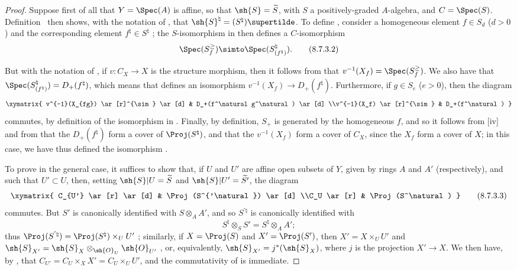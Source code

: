 \begin{proof}
Suppose first of all that $Y=\Spec(A)$ is affine, so that $\sh{S}=\widetilde{S}$, with $S$ a positively-graded $A$-algebra, and $C=\Spec(S)$.
Definition~ then shows, with the notation of , that $\sh{S}^\natural=(S^\natural)\supertilde$.
To define , consider a homogeneous element $f\in S_d$ ($d>0$) and the corresponding element $f^\natural\in S^\natural$ ;
the $S$-isomorphism in  then defines a $C$-isomorphism
\[
\label{II.8.7.3.2}
  \Spec(S_f^\geq) \simto \Spec(S_{(f^\natural)}^\natural).
\tag{8.7.3.2}
\]

But with the notation of , if $v:C_X\to X$ is the structure morphism, then it follows from  that $v^{-1}(X_f)=\Spec(S_f^\geq)$.
We also have that $\Spec(S_{(f^\natural)}^\natural)=D_+(f^\natural)$, which means that  defines an isomorphism $v^{-1}(X_f)\to D_+(f^\natural)$.
Furthermore, if $g\in S_e$ ($e>0$), then the diagram
\[
  \xymatrix{
    v^{-1}(X_{fg})
      \ar[r]^{\sim}
      \ar[d]
  & D_+(f^\natural g^\natural)
      \ar[d]
  \\v^{-1}(X_f)
      \ar[r]^{\sim}
  & D_+(f^\natural)
  }
\]
commutes, by definition of the isomorphism in .
Finally, by definition, $S_+$ is generated by the homogeneous $f$, and so it follows from [iv] and from  that the $D_+(f^\natural)$ form a cover of $\Proj(S^\natural)$, and that the $v^{-1}(X_f)$ form a cover of $C_X$, since the $X_f$ form a cover of $X$;
in this case, we have thus defined the isomorphism .

To prove  in the general case, it suffices to show that, if $U$ and $U'$ are affine open subsets of $Y$, given by rings $A$ and $A'$ (respectively), and such that $U'\subset U$, then, setting $\sh{S}|U=\widetilde{S}$ and $\sh{S}|U'=\widetilde{S'}$, the diagram
\[
\label{II.8.7.3.3}
  \xymatrix{
    C_{U'}
      \ar[r]
      \ar[d]
  & \Proj(S^{'\natural})
      \ar[d]
  \\C_U
      \ar[r]
  & \Proj(S^\natural)
  }
\tag{8.7.3.3}
\]
commutes.
But $S'$ is canonically identified with $S\otimes_A A'$, and so $S^{'\natural}$ is canonically identified with
\[
  S^\natural \otimes_S S' = S^\natural \otimes_A A';
\]
thus $\Proj(S^{'\natural}) = \Proj(S^\natural)\times_U U'$ ;
similarly, if $X=\Proj(S)$ and $X'=\Proj(S')$, then $X'=X\times_U U'$ and $\sh{S}_{X'}=\sh{S}_X\otimes_{\sh{O}_U}\sh{O}_{U'}$ , or, equivalently, $\sh{S}_{X'}=j^*(\sh{S}_X)$, where $j$ is the projection $X'\to X$.
We then have, by , that $C_{U'} = C_U\times_X X' = C_U\times_U U'$, and the commutativity of  is immediate.
\end{proof}

